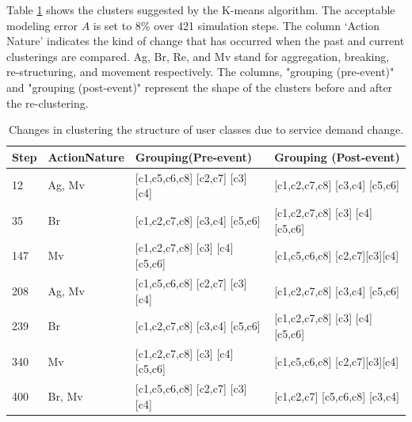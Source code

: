  Table \ref{tab:changes-clustering-structure} shows the clusters suggested by the K-means algorithm. The acceptable modeling error $A$ is set to 8\% over 421 simulation steps. The column `Action Nature' indicates the kind of change that has occurred when the past and current clusterings are compared. Ag, Br, Re, and Mv stand for aggregation, breaking, re-structuring, and movement respectively. The columns, "grouping (pre-event)" and "grouping (post-event)" represent the shape of the clusters before and after the re-clustering. %
\begin{table}
	\centering
\begin{tabular}{|p{0.3in}|p{0.8in}|p{2in}|p{2in}|} \hline 
Step & Action\newline Nature & Grouping\newline (Pre-event) & Grouping (Post-event) \\ \hline 
12 & Ag, Mv & [c1,c5,c6,c8] [c2,c7] [c3] [c4] & [c1,c2,c7,c8] [c3,c4]  [c5,c6] \\ \hline 
35 & Br & [c1,c2,c7,c8] [c3,c4] [c5,c6] & [c1,c2,c7,c8] [c3] [c4] [c5,c6] \\ \hline 
147 & Mv & [c1,c2,c7,c8] [c3] [c4] [c5,c6] & [c1,c5,c6,c8] [c2,c7][c3][c4] \\ \hline 
208 & Ag, Mv & [c1,c5,c6,c8] [c2,c7] [c3] [c4] & [c1,c2,c7,c8] [c3,c4] [c5,c6] \\ \hline 
239 & Br & [c1,c2,c7,c8] [c3,c4] [c5,c6] & [c1,c2,c7,c8] [c3] [c4] [c5,c6] \\ \hline 
340 & Mv & [c1,c2,c7,c8] [c3] [c4] [c5,c6] & [c1,c5,c6,c8] [c2,c7][c3][c4] \\ \hline 
400 & Br, Mv & [c1,c5,c6,c8] [c2,c7] [c3] [c4] & [c1,c2,c7] [c5,c6,c8] [c3,c4] \\ \hline 
\end{tabular}
	\caption[Changes in clustering the structure of user classes due to service demand change.]{Changes in clustering the structure of user classes due to service demand change.}
	\label{tab:changes-clustering-structure}  
\end{table}

